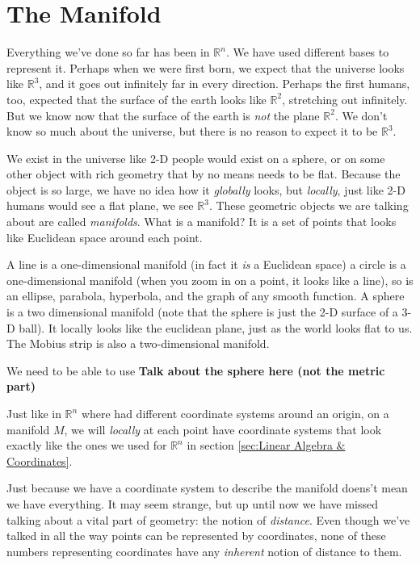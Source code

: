 \documentclass[../master.tex]{subfiles}
\begin{document}
	
	\section{The Manifold} %
	\label{sec:the_manifold}
	
	Everything we've done so far has been in $\mathbb{R}^n$. We have used different bases to represent it. Perhaps when we were first born, we expect that the universe looks like $\mathbb{R}^3$, and it goes out infinitely far in every direction.  Perhaps the first humans, too, expected that the surface of the earth looks like $\mathbb R^2$, stretching out infinitely. But we know now that the surface of the earth is \emph{not} the plane $\mathbb R^2$. We don't know so much about the universe, but there is no reason to expect it to be $\mathbb R^3$.
	
	We exist in the universe like 2-D people would exist on a sphere, or on some other object with rich geometry that by no means needs to be flat. Because the object is so large, we have no idea how it \emph{globally} looks, but \emph{locally}, just like 2-D humans would see a flat plane, we see $\mathbb R^3$. These geometric objects we are talking about are called \emph{manifolds}. What is a manifold? It is a set of points that looks like Euclidean space around each point.
	
	A line is a one-dimensional manifold (in fact it \emph{is} a Euclidean space) a circle is a one-dimensional manifold (when you zoom in on a point, it looks like a line), so is an ellipse, parabola, hyperbola, and the graph of any smooth function. A sphere is a two dimensional manifold (note that the sphere is just the 2-D surface of a 3-D ball). It locally looks like the euclidean plane, just as the world looks flat to us. The Mobius strip is also a two-dimensional manifold. 
	
	We need to be able to use 
	\textbf{Talk about the sphere here (not the metric part)}
	
	Just like in $\mathbb{R}^n$ where had different coordinate systems around an origin, on a manifold $M$, we will \emph{locally} at each point have coordinate systems that look exactly like the ones we used for $\mathbb{R}^n$ in section \ref{sec:Linear Algebra & Coordinates}. 
	
	Just because we have a coordinate system to describe the manifold doens't mean we have everything. It may seem strange, but up until now we have missed talking about a vital part of geometry: the notion of \emph{distance}. Even though we've talked in all the way points can be represented by coordinates, none of these numbers representing coordinates have any \emph{inherent} notion of distance to them. 
	
\end{document}
